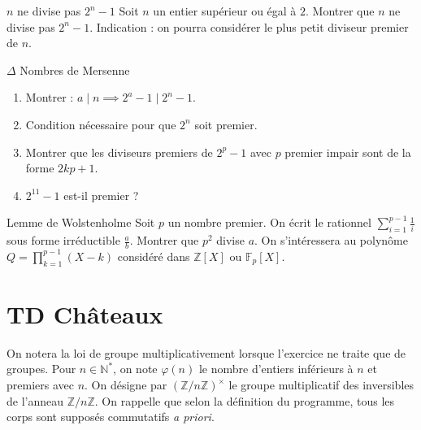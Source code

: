 \documentclass[french,a4paper]{article}
\newcommand{\N}{\mathbb{N}}
\newcommand{\Z}{\mathbb{Z}}
\newcommand{\st}{^*}
\newcommand{\F}{\mathbb{F}}
\theoremstyle{plain}
\theoremstyle{definition}
\theoremstyle{remark}
\begin{document}
\begin{ex}[Moulin.59]{$n$ ne divise pas $2^n-1$}
	Soit $n$ un entier supérieur ou égal à $2$. Montrer que $n$ ne divise pas $2^n-1$. Indication : on pourra considérer le plus petit diviseur premier de $n$.
\end{ex}

\begin{ex}[Moulin.60]{$\Delta$ Nombres de Mersenne}
	\begin{enumerate}
		\item Montrer : $a\mid n\implies 2^a-1\mid 2^n-1$.
		\item Condition nécessaire pour que $2^n$ soit premier.
		\item Montrer que les diviseurs premiers de $2^p-1$ avec $p$ premier impair sont de la forme $2kp+1$.
		\item $2^{11}-1$ est-il premier ?
	\end{enumerate}
\end{ex}

\begin{ex}[Châteaux]{Lemme de Wolstenholme}
	Soit $p$ un nombre premier. On écrit le rationnel $\displaystyle\sum_{i=1}^{p-1}\frac{1}{i}$ sous forme irréductible $\displaystyle\frac{a}{b}$. Montrer que $p^2$ divise $a$. On s'intéressera au polynôme $Q=\displaystyle\prod_{k=1}^{p-1}(X-k)$ considéré dans $\Z[X]$ ou $\F_p[X]$.
\end{ex}

\section{TD Châteaux}
On notera la loi de groupe multiplicativement lorsque l'exercice ne traite que de groupes. Pour $n\in\N\st$, on note $\varphi(n)$ le nombre d'entiers inférieurs à $n$ et premiers avec $n$. On désigne par $(\Z/n\Z)^\times$ le groupe multiplicatif des inversibles de l'anneau $\Z/n\Z$. On rappelle que selon la définition du programme, tous les corps sont supposés commutatifs \textit{a priori}.
\end{document}
